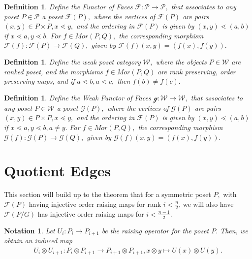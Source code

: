 \documentclass{amsart}
\newtheorem{defn}[subsubsection]{Definition}
\newtheorem{note}[subsubsection]{Notation}
\begin{document}
\begin{defn}
Define the {\it Functor of Faces} $\mathcal F:\mathcal P \rightarrow \mathcal P,$ that associates to any poset $P \in \mathcal P$ a poset $\mathcal F(P),$ where the vertices of $\mathcal F(P)$ are pairs $(x,y)\in P \times P,x \lessdot y,$ and the ordering in $\mathcal F(P)$ is given by $(x,y)\lessdot (a,b)$ if $x \lessdot a,y\lessdot b.$ For $f \in Mor(P,Q),$ the corresponding morphism $\mathcal F(f):\mathcal F(P) \rightarrow \mathcal F(Q),$ given by $\mathcal F(f)(x,y) = (f(x),f(y)).$
\end{defn}

\begin{defn}
Define the {\it weak poset category} $\mathcal W,$ where the objects $P \in \mathcal W$ are ranked poset, and the morphisms $f\in Mor(P,Q)$ are rank preserving, order preserving maps, and if $a \lessdot b,a\lessdot c,$ then $f(b)\neq f(c).$
\end{defn}


\begin{defn}
Define the {\it Weak Functor of Faces} $\mathcal g:\mathcal W \rightarrow \mathcal W,$ that associates to any poset $P \in \mathcal W$ a poset $\mathcal G(P),$ where the vertices of $\mathcal G(P)$ are pairs $(x,y)\in P \times P,x \lessdot y,$ and the ordering in $\mathcal F(P)$ is given by $(x,y)\lessdot (a,b)$ if $x \lessdot a,y\lessdot b,a\neq y.$ For $f \in Mor(P,Q),$ the corresponding morphism $\mathcal G(f):\mathcal G(P) \rightarrow \mathcal G(Q),$ given by $\mathcal G(f)(x,y) = (f(x),f(y)).$
\end{defn}



\section{Quotient Edges}

This section will build up to the theorem that for a symmetric poset $P,$ with $\mathcal F(P)$ having injective order raising maps for rank $i < \frac{n}{2}$, we will also have $\mathcal F(P/G)$ has injective order raising maps for $i < \frac{n-1}{2}.$ 

\begin{note}
Let $U_i:P_i \rightarrow P_{i+1}$ be the raising operator for the poset $P.$ Then, we obtain an induced map
\begin{align*}
	U_i \otimes U_{i+1}:P_i\otimes P_{i+1} \rightarrow P_{i+1} \otimes P_{i+1},x \otimes y \mapsto U(x) \otimes U(y).
\end{align*}
\end{note}
\end{document}
